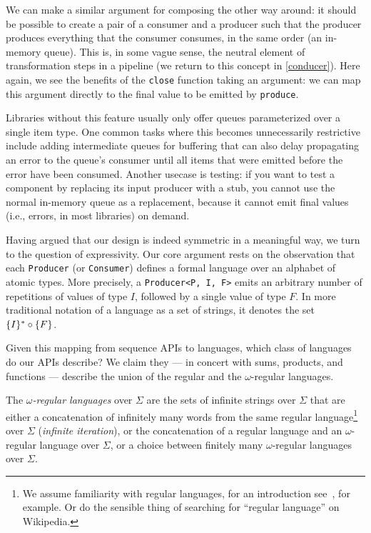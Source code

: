 \documentclass[sigplan,screen,10pt,anonymous,review]{acmart}
\begin{document}
We can make a similar argument for composing the other way around: it should be possible to create a pair of a consumer and a producer such that the producer produces everything that the consumer consumes, in the same order (an in-memory queue). This is, in some vague sense, the neutral element of transformation steps in a pipeline (we return to this concept in \cref{conducer}). Here again, we see the benefits of the \texttt{close} function taking an argument: we can map this argument directly to the final value to be emitted by \texttt{produce}.

Libraries without this feature usually only offer queues parameterized over a single item type. One common tasks where this becomes unnecessarily restrictive include adding intermediate queues for buffering that can also delay propagating an error to the queue's consumer until all items that were emitted before the error have been consumed. Another usecase is testing: if you want to test a component by replacing its input producer with a stub, you cannot use the normal in-memory queue as a replacement, because it cannot emit final values (i.e., errors, in most libraries) on demand.

Having argued that our design is indeed symmetric in a meaningful way, we turn to the question of expressivity. Our core argument rests on the observation that each \texttt{Producer} (or \texttt{Consumer}) defines a formal language over an alphabet of atomic types. More precisely, a \texttt{Producer<P, I, F>} emits an arbitrary number of repetitions of values of type $I$, followed by a single value of type $F$. In more traditional notation of a language as a set of strings, it denotes the set $\{I\}^{\ast} \circ \{F\}$.

Given this mapping from sequence APIs to languages, which class of languages do our APIs describe? We claim they --- in concert with sums, products, and functions --- describe the union of the regular and the $\omega$-regular languages.

The \textit{$\omega$-regular languages} over $\Sigma$ are the sets of infinite strings over $\Sigma$ that are either a concatenation of infinitely many words from the same regular language\footnote{We assume familiarity with regular languages, for an introduction see~\cite{hopcroft1969formal}, for example. Or do the sensible thing of searching for ``regular language'' on Wikipedia.} over $\Sigma$ (\textit{infinite iteration}), or the concatenation of a regular language and an $\omega$-regular language over $\Sigma$, or a choice between finitely many $\omega$-regular languages over $\Sigma$.
\end{document}
